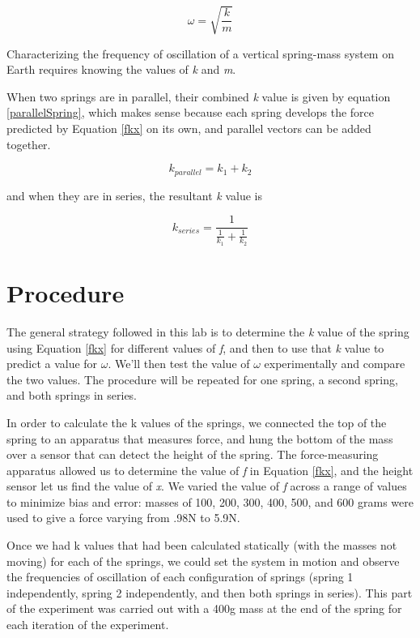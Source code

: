 \documentclass[]{article}
\begin{document}
\begin{equation}\label{findTheOmega}
\omega = \sqrt{\frac{k}{m}}
\end{equation}

Characterizing the frequency of oscillation of a vertical spring-mass system on Earth requires knowing the values of \textit{k} and \textit{m}.


When two springs are in parallel, their combined \textit{k} value is given by equation \ref{parallelSpring}, which makes sense because each spring develops the force predicted by Equation \ref{fkx} on its own, and parallel vectors can be added together.

\begin{equation}\label{parallelSpring}
k_{parallel} = k_1 + k_2
\end{equation}

and when they are in series, the resultant \textit{k} value is

\begin{equation}\label{seriesSpring}
k_{series}=\frac{1}{\frac{1}{k_1} + \frac{1}{k_2}}
\end{equation}

\section{Procedure}
\raggedright
The general strategy followed in this lab is to determine the \textit{k} value of the spring using Equation \ref{fkx} for different values of \textit{f}, and then to use that \textit{k} value to predict a value for $\omega$. We'll then test the value of $\omega$ experimentally and compare the two values. The procedure will be repeated for one spring, a second spring, and both springs in series.

In order to calculate the k values of the springs, we connected the top of the spring to an apparatus that measures force, and hung the bottom of the mass over a sensor that can detect the height of the spring. The force-measuring apparatus allowed us to determine the value of \textit{f} in Equation \ref{fkx}, and the height sensor let us find the value of \textit{x}. We varied the value of \textit{f} across a range of values to minimize bias and error: masses of 100, 200, 300, 400, 500, and 600 grams were used to give a force varying from .98N to 5.9N. 

Once we had k values that had been calculated statically (with the masses not moving) for each of the springs, we could set the system in motion and observe the frequencies of oscillation of each configuration of springs (spring 1 independently, spring 2 independently, and then both springs in series). This part of the experiment was carried out with a 400g mass at the end of the spring for each iteration of the experiment.
\end{document}
